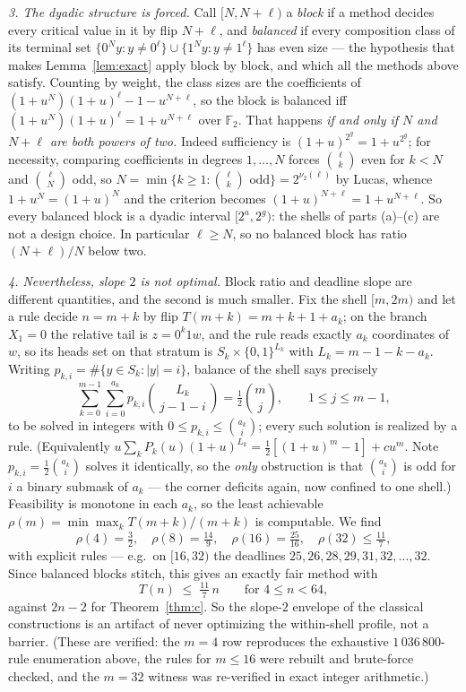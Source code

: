 \documentclass[11pt]{article}
\theoremstyle{remark}
\begin{document}
\emph{3. The dyadic structure is forced.} Call $[N,N+\ell)$ a \emph{block} if
a method decides every critical value in it by flip $N+\ell$, and
\emph{balanced} if every composition class of its terminal set
$\{0^Ny: y\ne 0^\ell\}\cup\{1^Ny: y\ne 1^\ell\}$ has even size --- the
hypothesis that makes Lemma~\ref{lem:exact} apply block by block, and which
all the methods above satisfy. Counting by weight, the class sizes are the
coefficients of $(1+u^N)(1+u)^\ell-1-u^{N+\ell}$, so the block is balanced
iff $(1+u^N)(1+u)^\ell=1+u^{N+\ell}$ over $\mathbb F_2$. That happens
\emph{if and only if $N$ and $N+\ell$ are both powers of two.} Indeed
sufficiency is $(1+u)^{2^g}=1+u^{2^g}$; for necessity, comparing coefficients
in degrees $1,\dots,N$ forces $\binom{\ell}{k}$ even for $k<N$ and
$\binom{\ell}{N}$ odd, so $N=\min\{k\ge1:\binom{\ell}{k}\text{ odd}\}
=2^{\nu_2(\ell)}$ by Lucas, whence $1+u^N=(1+u)^N$ and the criterion becomes
$(1+u)^{N+\ell}=1+u^{N+\ell}$. So every balanced block is a dyadic interval
$[2^a,2^g)$: the shells of parts (a)--(c) are not a design choice. In
particular $\ell\ge N$, so no balanced block has ratio $(N+\ell)/N$ below
two.

\emph{4. Nevertheless, slope $2$ is not optimal.} Block ratio and deadline
slope are different quantities, and the second is much smaller. Fix the shell
$[m,2m)$ and let a rule decide $n=m+k$ by flip $T(m+k)=m+k+1+a_k$; on the
branch $X_1=0$ the relative tail is $z=0^k1w$, and the rule reads exactly
$a_k$ coordinates of $w$, so its heads set on that stratum is
$S_k\times\{0,1\}^{L_k}$ with $L_k=m-1-k-a_k$. Writing
$p_{k,i}=\#\{y\in S_k:|y|=i\}$, balance of the shell says precisely
\[
\sum_{k=0}^{m-1}\sum_{i=0}^{a_k}p_{k,i}\binom{L_k}{\,j-1-i\,}
=\tfrac12\binom mj,\qquad 1\le j\le m-1,
\]
to be solved in integers with $0\le p_{k,i}\le\binom{a_k}i$; every such
solution is realized by a rule. (Equivalently
$u\sum_kP_k(u)(1+u)^{L_k}=\tfrac12[(1+u)^m-1]+cu^m$. Note
$p_{k,i}=\tfrac12\binom{a_k}i$ solves it identically, so the \emph{only}
obstruction is that $\binom{a_k}i$ is odd for $i$ a binary submask of $a_k$
--- the corner deficits again, now confined to one shell.) Feasibility is
monotone in each $a_k$, so the least achievable
$\rho(m)=\min\max_kT(m+k)/(m+k)$ is computable. We find
\[
\rho(4)=\tfrac32,\quad \rho(8)=\tfrac{14}9,\quad
\rho(16)=\tfrac{25}{16},\quad \rho(32)\le\tfrac{11}7,
\]
with explicit rules --- e.g.\ on $[16,32)$ the deadlines
$25,26,28,29,31,32,\dots,32$. Since balanced blocks stitch, this gives an
exactly fair method with
\[
T(n)\;\le\;\tfrac{11}{7}\,n \qquad\text{for } 4\le n<64,
\]
against $2n-2$ for Theorem~\ref{thm:c}. So the slope-$2$ envelope of the
classical constructions is an artifact of never optimizing the within-shell
profile, not a barrier. (These are verified: the $m=4$ row reproduces the
exhaustive $1\,036\,800$-rule enumeration above, the rules for $m\le16$ were
rebuilt and brute-force checked, and the $m=32$ witness was re-verified in
exact integer arithmetic.)
\end{document}
